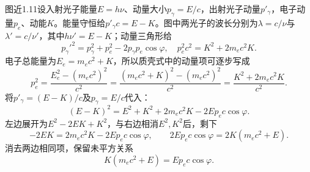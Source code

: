 \documentclass[UTF8,fontset=fandol,a4paper,11pt]{ctexart}
\begin{document}
图近1.11设入射光子能量$E=h\nu$、动量大小$p_\gamma=E/c$，出射光子动量$p'_\gamma$，电子动量$p_e$、动能$K$。能量守恒给$p'_\gamma c=E-K$。图中两光子的波长分别为$\lambda=c/\nu$与$\lambda'=c/\nu'$，其中$h\nu'=E-K$；动量三角形给
\[
p_\gamma'^2=p_\gamma^2+p_e^2-2p_\gamma p_e\cos\varphi,
\quad p_e^2c^2=K^2+2m_ec^2K.
\]
电子总能量为$E_e=m_ec^2+K$，所以质壳式中的动量项可逐步写成
\[
p_e^2=\frac{E_e^2-(m_ec^2)^2}{c^2}
=\frac{(m_ec^2+K)^2-(m_ec^2)^2}{c^2}
=\frac{K^2+2m_ec^2K}{c^2}.
\]
将$p'_\gamma=(E-K)/c$及$p_\gamma=E/c$代入：
\[
(E-K)^2=E^2+K^2+2m_ec^2K-2Ep_ec\cos\varphi.
\]
左边展开为$E^2-2EK+K^2$，与右边相消$E^2,K^2$后，剩下
\[
-2EK=2m_ec^2K-2Ep_ec\cos\varphi,
\qquad 2Ep_ec\cos\varphi=2K(m_ec^2+E).
\]
消去两边相同项，保留未平方关系
\[
\boxed{K(m_ec^2+E)=Ep_ec\cos\varphi}.
\]
\begin{center}\begin{minipage}{.98\linewidth}\centering
\begin{tikzpicture}[scale=.72,transform shape]

\end{tikzpicture}
\end{minipage}
\end{center}
\end{document}
